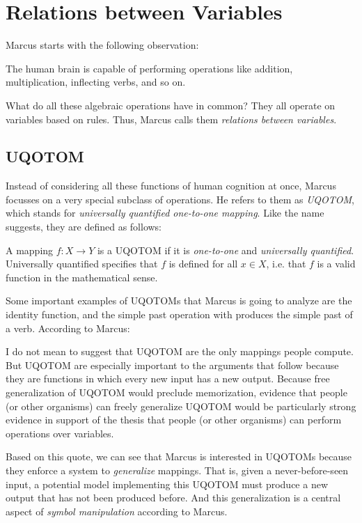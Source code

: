 \documentclass[../../main.tex]{subfiles}
\begin{document}
\chapter{Relations between Variables}
Marcus starts with the following observation:

\begin{observation}
    The human brain is capable of performing operations like addition, multiplication, inflecting verbs, and so on.
\end{observation}

What do all these algebraic operations have in common? They all operate on variables based on rules. Thus, Marcus calls them \emph{relations between variables}.

\section{UQOTOM}
Instead of considering all these functions of human cognition at once, Marcus focusses on a very special subclass of operations. He refers to them as \emph{UQOTOM}, which stands for \emph{universally quantified one-to-one mapping}. Like the name suggests, they are defined as follows:

\begin{definition}[UQOTOM]
    A mapping $f: X \to Y$ is a UQOTOM if it is \emph{one-to-one} and \emph{universally quantified}. Universally quantified specifies that $f$ is defined for all $x \in X$, i.e. that $f$ is a valid function in the mathematical sense.
\end{definition}

Some important examples of UQOTOMs that Marcus is going to analyze are the identity function, and the simple past operation with produces the simple past of a verb. According to Marcus:

\begin{citecallout}
    I do not mean to suggest that UQOTOM are the only mappings
    people compute. But UQOTOM are especially important to the arguments that follow because they are functions in which every new input has a new output. Because free generalization of UQOTOM would
    preclude memorization, evidence that people (or other organisms) can
    freely generalize UQOTOM would be particularly strong evidence in
    support of the thesis that people (or other organisms) can perform operations over variables.
\end{citecallout}

Based on this quote, we can see that Marcus is interested in UQOTOMs because they enforce a system to \emph{generalize} mappings. That is, given a never-before-seen input, a potential model implementing this UQOTOM must produce a new output that has not been produced before. And this generalization is a central aspect of \emph{symbol manipulation} according to Marcus.
\end{document}
